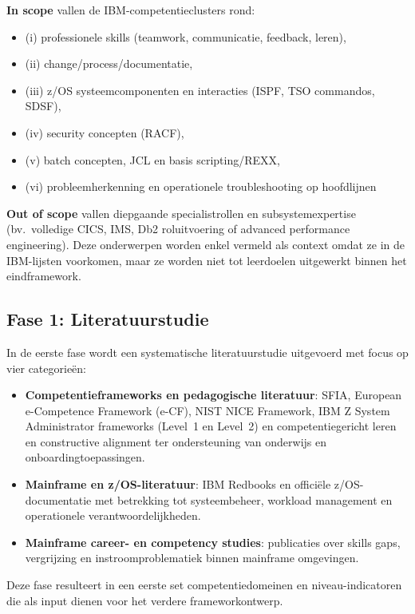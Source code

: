 \textbf{In scope} vallen de IBM-competentieclusters rond:
\begin{itemize}
	\item(i) professionele skills (teamwork, communicatie, feedback, leren), 
	\item(ii) change/process/documentatie,
    \item(iii) z/OS systeemcomponenten en interacties (ISPF, TSO commandos, SDSF),
	\item(iv) security concepten (RACF),
	\item(v) batch concepten, JCL en basis scripting/REXX,
	\item(vi) probleemherkenning en operationele troubleshooting op hoofdlijnen
\end{itemize}

\textbf{Out of scope} vallen diepgaande specialistrollen en subsystemexpertise (bv.\ volledige CICS, IMS, Db2 roluitvoering of advanced performance engineering). 
Deze onderwerpen worden enkel vermeld als context omdat ze in de IBM-lijsten voorkomen, maar ze worden niet tot leerdoelen uitgewerkt binnen het eindframework.

\subsection{Fase 1: Literatuurstudie}

In de eerste fase wordt een systematische literatuurstudie uitgevoerd met focus op vier categorieën:
\begin{itemize}
	\item \textbf{Competentieframeworks en pedagogische literatuur}: SFIA, European e-Competence Framework (e-CF), NIST NICE Framework, IBM Z System Administrator frameworks (Level~1 en Level~2) en competentiegericht leren en constructive alignment ter ondersteuning van onderwijs en onboardingtoepassingen.
	\item \textbf{Mainframe en z/OS-literatuur}: IBM Redbooks en officiële z/OS-documentatie met betrekking tot systeembeheer, workload management en operationele verantwoordelijkheden.
	\item \textbf{Mainframe career- en competency studies}: publicaties over skills gaps, vergrijzing en instroomproblematiek binnen mainframe omgevingen.
\end{itemize}

Deze fase resulteert in een eerste set competentiedomeinen en niveau-indicatoren die als input dienen voor het verdere frameworkontwerp.

